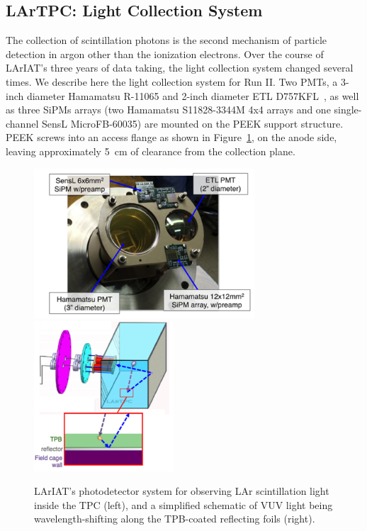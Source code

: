 \subsection{LArTPC: Light Collection System}\label{sec:TPCLight} 
The collection of scintillation photons is the second mechanism of particle detection in argon other than the ionization electrons. Over the course of LArIAT's three years of data taking, the light collection system changed several times. We describe here the light collection system for Run II. Two PMTs, a 3-inch diameter Hamamatsu R-11065 and 2-inch diameter ETL D757KFL~\cite{lightsys-pmttests}, as well as three SiPMs arrays (two Hamamatsu S11828-3344M 4x4 arrays and one single-channel SensL MicroFB-60035) are mounted on the PEEK support structure. PEEK screws into an access flange as shown in Figure~\ref{lightsys_pmts}, on the anode side, leaving  approximately 5~cm of clearance from the collection plane.  

\begin{figure}
\centering
\includegraphics[height=2.2in]{Chapter-3/Images/lightsys_pmts.png}
\hspace{1cm}
\includegraphics[height=2.2in]{Chapter-3/Images/lightsys_wls.png}
\caption{LArIAT's photodetector system for observing LAr scintillation light inside the TPC (left), and a simplified schematic of VUV light being wavelength-shifting along the TPB-coated reflecting foils (right).}
\label{lightsys_pmts}
\end{figure}

